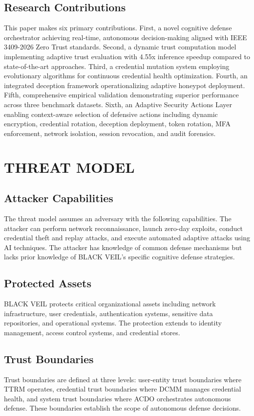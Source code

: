 \documentclass[12pt]{article}
\begin{document}
\subsection{Research Contributions}
This paper makes six primary contributions. First, a novel cognitive defense orchestrator achieving real-time, autonomous decision-making aligned with IEEE 3409-2026 Zero Trust standards. Second, a dynamic trust computation model implementing adaptive trust evaluation with 4.55x inference speedup compared to state-of-the-art approaches. Third, a credential mutation system employing evolutionary algorithms for continuous credential health optimization. Fourth, an integrated deception framework operationalizing adaptive honeypot deployment. Fifth, comprehensive empirical validation demonstrating superior performance across three benchmark datasets. Sixth, an Adaptive Security Actions Layer enabling context-aware selection of defensive actions including dynamic encryption, credential rotation, deception deployment, token rotation, MFA enforcement, network isolation, session revocation, and audit forensics.

\newpage

\section{THREAT MODEL}

\subsection{Attacker Capabilities}
The threat model assumes an adversary with the following capabilities. The attacker can perform network reconnaissance, launch zero-day exploits, conduct credential theft and replay attacks, and execute automated adaptive attacks using AI techniques. The attacker has knowledge of common defense mechanisms but lacks prior knowledge of BLACK VEIL's specific cognitive defense strategies.

\subsection{Protected Assets}
BLACK VEIL protects critical organizational assets including network infrastructure, user credentials, authentication systems, sensitive data repositories, and operational systems. The protection extends to identity management, access control systems, and credential stores.

\subsection{Trust Boundaries}
Trust boundaries are defined at three levels: user-entity trust boundaries where TTRM operates, credential trust boundaries where DCMM manages credential health, and system trust boundaries where ACDO orchestrates autonomous defense. These boundaries establish the scope of autonomous defense decisions.
\end{document}
